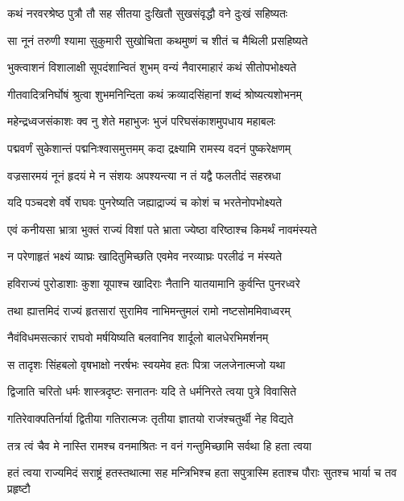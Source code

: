 \twolineshloka
{कथं नरवरश्रेष्ठ पुत्रौ तौ सह सीतया}
{दुःखितौ सुखसंवृद्धौ वने दुःखं सहिष्यतः} %

\twolineshloka
{सा नूनं तरुणी श्यामा सुकुमारी सुखोचिता}
{कथमुष्णं च शीतं च मैथिली प्रसहिष्यते} %

\twolineshloka
{भुक्त्वाशनं विशालाक्षी सूपदंशान्वितं शुभम्}
{वन्यं नैवारमाहारं कथं सीतोपभोक्ष्यते} %

\twolineshloka
{गीतवादित्रनिर्घोषं श्रुत्वा शुभमनिन्दिता}
{कथं क्रव्यादसिंहानां शब्दं श्रोष्यत्यशोभनम्} %

\twolineshloka
{महेन्द्रध्वजसंकाशः क्व नु शेते महाभुजः}
{भुजं परिघसंकाशमुपधाय महाबलः} %

\twolineshloka
{पद्मवर्णं सुकेशान्तं पद्मनिःश्वासमुत्तमम्}
{कदा द्रक्ष्यामि रामस्य वदनं पुष्करेक्षणम्} %

\twolineshloka
{वज्रसारमयं नूनं हृदयं मे न संशयः}
{अपश्यन्त्या न तं यद्वै फलतीदं सहस्रधा} %

\twolineshloka
{यदि पञ्चदशे वर्षे राघवः पुनरेष्यति}
{जह्याद्राज्यं च कोशं च भरतेनोपभोक्ष्यते} %

\twolineshloka
{एवं कनीयसा भ्रात्रा भुक्तं राज्यं विशां पते}
{भ्राता ज्येष्ठा वरिष्ठाश्च किमर्थं नावमंस्यते} %

\twolineshloka
{न परेणाहृतं भक्ष्यं व्याघ्रः खादितुमिच्छति}
{एवमेव नरव्याघ्रः परलीढं न मंस्यते} %

\twolineshloka
{हविराज्यं पुरोडाशाः कुशा यूपाश्च खादिराः}
{नैतानि यातयामानि कुर्वन्ति पुनरध्वरे} %

\twolineshloka
{तथा ह्यात्तमिदं राज्यं हृतसारां सुरामिव}
{नाभिमन्तुमलं रामो नष्टसोममिवाध्वरम्} %

\twolineshloka
{नैवंविधमसत्कारं राघवो मर्षयिष्यति}
{बलवानिव शार्दूलो बालधेरभिमर्शनम्} %

\twolineshloka
{स तादृशः सिंहबलो वृषभाक्षो नरर्षभः}
{स्वयमेव हतः पित्रा जलजेनात्मजो यथा} %

\twolineshloka
{द्विजाति चरितो धर्मः शास्त्रदृष्टः सनातनः}
{यदि ते धर्मनिरते त्वया पुत्रे विवासिते} %

\twolineshloka
{गतिरेवाक्पतिर्नार्या द्वितीया गतिरात्मजः}
{तृतीया ज्ञातयो राजंश्चतुर्थी नेह विद्यते} %

\twolineshloka
{तत्र त्वं चैव मे नास्ति रामश्च वनमाश्रितः}
{न वनं गन्तुमिच्छामि सर्वथा हि हता त्वया} %

\fourlineindentedshloka
{हतं त्वया राज्यमिदं सराष्ट्रं}
{ हतस्तथात्मा सह मन्त्रिभिश्च}
{हता सपुत्रास्मि हताश्च पौराः}
{ सुतश्च भार्या च तव प्रहृष्टौ} %

